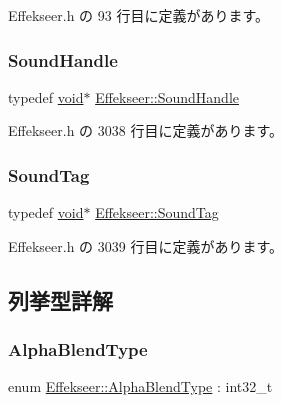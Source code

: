  Effekseer.\+h の 93 行目に定義があります。

\mbox{\label{namespace_effekseer_a694a300b9b688ca40f6a0d9841d437bf}} 
\subsubsection{\texorpdfstring{Sound\+Handle}{SoundHandle}}
{\footnotesize\ttfamily typedef \mbox{\hyperlink{namespace_effekseer_ab34c4088e512200cf4c2716f168deb56}{void}}$\ast$ \mbox{\hyperlink{namespace_effekseer_a694a300b9b688ca40f6a0d9841d437bf}{Effekseer\+::\+Sound\+Handle}}}



 Effekseer.\+h の 3038 行目に定義があります。

\mbox{\label{namespace_effekseer_adb219197297396cf2ab9bee657551a29}} 
\subsubsection{\texorpdfstring{Sound\+Tag}{SoundTag}}
{\footnotesize\ttfamily typedef \mbox{\hyperlink{namespace_effekseer_ab34c4088e512200cf4c2716f168deb56}{void}}$\ast$ \mbox{\hyperlink{namespace_effekseer_adb219197297396cf2ab9bee657551a29}{Effekseer\+::\+Sound\+Tag}}}



 Effekseer.\+h の 3039 行目に定義があります。



\subsection{列挙型詳解}
\mbox{\label{namespace_effekseer_a8c32fd5b7ec7feed73314b2ae8086949}} 
\subsubsection{\texorpdfstring{Alpha\+Blend\+Type}{AlphaBlendType}}
{\footnotesize\ttfamily enum \mbox{\hyperlink{namespace_effekseer_a8c32fd5b7ec7feed73314b2ae8086949}{Effekseer\+::\+Alpha\+Blend\+Type}} \+: int32\+\_\+t\hspace{0.3cm}{\ttfamily [strong]}}



